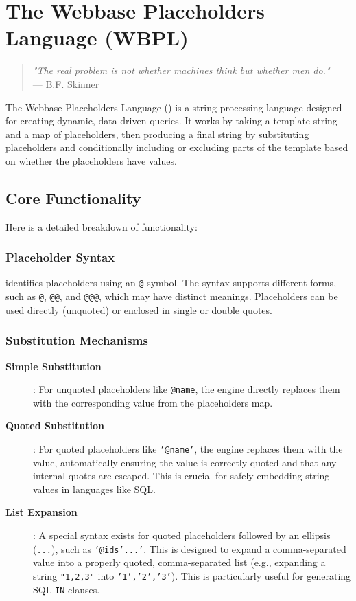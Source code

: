 
\chapter{The Webbase Placeholders Language (WBPL)}
\label{chap:wbpl}

\begin{quote}
\textit{"The real problem is not whether machines think but whether men do."} \\
— B.F. Skinner
\end{quote}

The Webbase Placeholders Language (\wbpl{}) is a string processing language designed for creating dynamic, data-driven queries. It works by taking a template string and a map of placeholders, then producing a final string by substituting placeholders and conditionally including or excluding parts of the template based on whether the placeholders have values.

\section{Core Functionality}
\label{sec:wbpl-core}

Here is a detailed breakdown of \wbpl{} functionality:

\subsection{Placeholder Syntax}

\wbpl{} identifies placeholders using an \texttt{@} symbol. The syntax supports different forms, such as \texttt{@}, \texttt{@@}, and \texttt{@@@}, which may have distinct meanings. Placeholders can be used directly (unquoted) or enclosed in single or double quotes.

\subsection{Substitution Mechanisms}

\begin{description}
\item[\textbf{Simple Substitution}]: For unquoted placeholders like \texttt{@name}, the engine directly replaces them with the corresponding value from the placeholders map.

\item[\textbf{Quoted Substitution}]: For quoted placeholders like \texttt{'@name'}, the engine replaces them with the value, automatically ensuring the value is correctly quoted and that any internal quotes are escaped. This is crucial for safely embedding string values in languages like SQL.

\item[\textbf{List Expansion}]: A special syntax exists for quoted placeholders followed by an ellipsis (\texttt{...}), such as \texttt{'@ids'...'}. This is designed to expand a comma-separated value into a properly quoted, comma-separated list (e.g., expanding a string \texttt{"1,2,3"} into \texttt{'1','2','3'}). This is particularly useful for generating SQL \texttt{IN} clauses.
\end{description}

